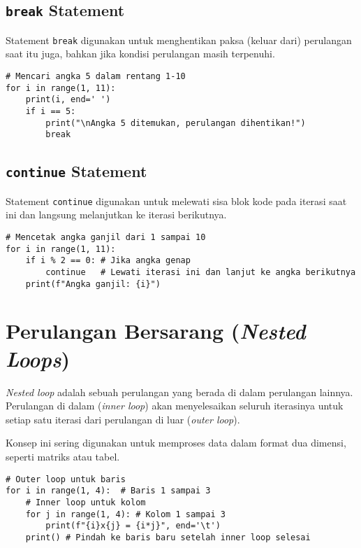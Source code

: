 \subsection{\texttt{break} Statement}
Statement \texttt{break} digunakan untuk menghentikan paksa (keluar dari) perulangan saat itu juga, bahkan jika kondisi perulangan masih terpenuhi.

\begin{lstlisting}[style=PythonStyle, caption={Kode Python: break_keyword.py}]
# Mencari angka 5 dalam rentang 1-10
for i in range(1, 11):
    print(i, end=' ')
    if i == 5:
        print("\nAngka 5 ditemukan, perulangan dihentikan!")
        break 
\end{lstlisting}

\subsection{\texttt{continue} Statement}
Statement \texttt{continue} digunakan untuk melewati sisa blok kode pada iterasi saat ini dan langsung melanjutkan ke iterasi berikutnya.

\begin{lstlisting}[style=PythonStyle, caption={Kode Python: continue_keyword.py}]
# Mencetak angka ganjil dari 1 sampai 10
for i in range(1, 11):
    if i % 2 == 0: # Jika angka genap
        continue   # Lewati iterasi ini dan lanjut ke angka berikutnya
    print(f"Angka ganjil: {i}")
\end{lstlisting}

\section{Perulangan Bersarang (\textit{Nested Loops})}
\textit{Nested loop} adalah sebuah perulangan yang berada di dalam perulangan lainnya. Perulangan di dalam (\textit{inner loop}) akan menyelesaikan seluruh iterasinya untuk setiap satu iterasi dari perulangan di luar (\textit{outer loop}).

Konsep ini sering digunakan untuk memproses data dalam format dua dimensi, seperti matriks atau tabel.

\begin{lstlisting}[style=PythonStyle, caption={Kode Python: nested_loop.py}]
# Outer loop untuk baris
for i in range(1, 4):  # Baris 1 sampai 3
    # Inner loop untuk kolom
    for j in range(1, 4): # Kolom 1 sampai 3
        print(f"{i}x{j} = {i*j}", end='\t')
    print() # Pindah ke baris baru setelah inner loop selesai
\end{lstlisting}

